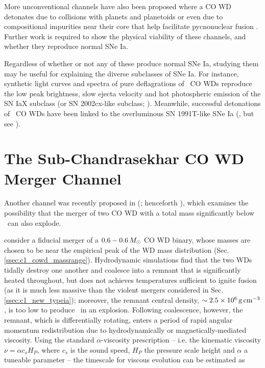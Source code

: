 More unconventional channels have also been proposed where a CO WD detonates due to collisions with planets and planetoids \citep{distfg15} or even due to compositional impurities near their core that help facilitate pycnonuclear fusion \citep{chio+15}.  Further work is required to show the physical viability of these channels, and whether they reproduce normal SNe Ia.  

Regardless of whether or not any of these produce normal SNe Ia, studying them may be useful for explaining the diverse subclasses of SNe Ia.  For instance, synthetic light curves and spectra of pure deflagrations of \Mch\ CO WDs \citep{phil+07, krom+13, fink+14} reproduce the low peak brightness, slow ejecta velocity and hot photospheric emission of the SN IaX subclass (or SN 2002cx-like subclass; \citealt{li+02, fole+13}).  Meanwhile, successful detonations of \Mch\ CO WDs have been linked to the overluminous SN 1991T-like SNe Ia (\citealt{fishj15}, but see \citealt{seit+16}).


\section{The Sub-Chandrasekhar CO WD Merger Channel}
\label{sec:c1_vkchannel}

Another channel was recently proposed in \citeauthor{vkercj10} (\citeyear{vkercj10}; henceforth \citeal{vkercj10}), which examines the possibility that the merger of two CO WD with a total mass significantly below \Mch\ can also explode.

\citeal{vkercj10} consider a fiducial merger of a $0.6-0.6\,\Msun$ CO WD binary, whose masses are chosen to be near the empirical peak of the WD mass distribution (Sec. \ref{ssec:c1_cowd_massrange}).  Hydrodynamic simulations \citep{loreig09} find that the two WDs tidally destroy one another and coalesce into a remnant that is significantly heated throughout, but does not achieves temperatures sufficient to ignite fusion (as it is much less massive than the violent mergers considered in Sec. \ref{ssec:c1_new_typeia}); moreover, the remnant central density, $\sim2.5\times10^6\,\gcc$, is too low to produce \Ni\ in an explosion.  Following coalescence, however, the remnant, which is differentially rotating, enters a period of rapid angular momentum redistribution due to hydrodynamically or magnetically-mediated viscosity.  Using the standard $\alpha$-viscosity prescription \citep{shaks73} -- i.e. the kinematic viscosity $\nu = \alpha c_s H_P$, where $c_s$ is the sound speed, $H_P$ the pressure scale height and $\alpha$ a tuneable parameter -- the timescale for viscous evolution can be estimated as

